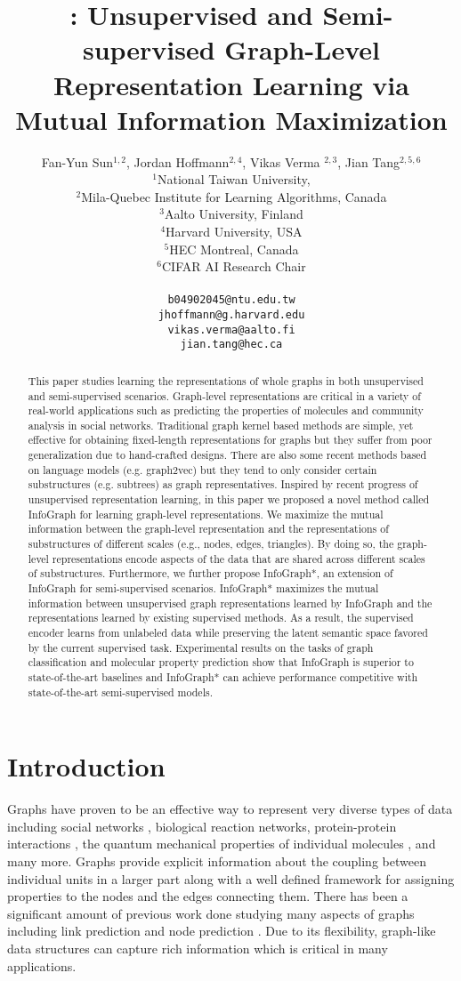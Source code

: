 \documentclass{article} \usepackage{iclr2020_conference,times}
\title{\method{}: Unsupervised and Semi-supervised Graph-Level Representation Learning via Mutual Information Maximization}
\author{Fan-Yun Sun$^{1,2}$, Jordan Hoffmann$^{2,4}$, Vikas Verma $^{2,3}$, Jian Tang$^{2,5,6}$\\
$^1$National Taiwan University, \\
$^2$Mila-Quebec Institute for Learning Algorithms, Canada \\
$^3$Aalto University, Finland \\
$^4$Harvard University, USA \\
$^5$HEC Montreal, Canada \\
$^6$CIFAR AI Research Chair\\\\
\texttt{b04902045@ntu.edu.tw}\\
\texttt{jhoffmann@g.harvard.edu}\\
\texttt{vikas.verma@aalto.fi}\\
\texttt{jian.tang@hec.ca}
}
\def\method{InfoGraph}
\begin{document}
\maketitle

\begin{abstract}
This paper studies learning the representations of whole graphs in both unsupervised and semi-supervised scenarios. Graph-level representations are critical in a variety of real-world applications such as predicting the properties of molecules and community analysis in social networks. Traditional graph kernel based methods are simple, yet effective for obtaining fixed-length representations for graphs but they suffer from poor generalization due to hand-crafted designs. There are also some recent methods based on language models (e.g. graph2vec) but they tend to only consider certain substructures (e.g. subtrees) as graph representatives. Inspired by recent progress of unsupervised representation learning, in this paper we proposed a novel method called \method{} for learning graph-level representations. We maximize the mutual information between the graph-level representation and the representations of substructures of different scales (e.g., nodes, edges, triangles).
By doing so, the graph-level representations encode aspects of the data that are shared across different scales of substructures.
Furthermore, we further propose \method{}*, an extension of \method{} for semi-supervised scenarios. \method{}* maximizes the mutual information between unsupervised graph representations learned by \method{} and the representations learned by existing supervised methods.
As a result, the supervised encoder learns from unlabeled data while preserving the latent semantic space favored by the current supervised task. 
Experimental results on the tasks of graph classification and molecular property prediction 
show that \method{} is superior to state-of-the-art baselines and \method{}* can achieve performance competitive with state-of-the-art semi-supervised models.
\end{abstract}

\section{Introduction}


Graphs have proven to be an effective way to represent very diverse types of data including social networks \cite{newman2004finding}, biological reaction networks\cite{pavlopoulos2011using}, protein-protein interactions \cite{krogan2006global}, the quantum mechanical properties of individual molecules \cite{xie2018crystal,jin2018junction}, and many more.  
Graphs provide explicit information about the coupling between individual units in a larger part along with a well defined framework for assigning properties to the nodes and the edges connecting them. 
There has been a significant amount of previous work done studying many aspects of graphs including link prediction \cite{gao2011temporal,wang2011community} and node prediction \cite{blei2003latent}. 
Due to its flexibility, graph-like data structures can capture rich information which is critical in many applications.
\end{document}
